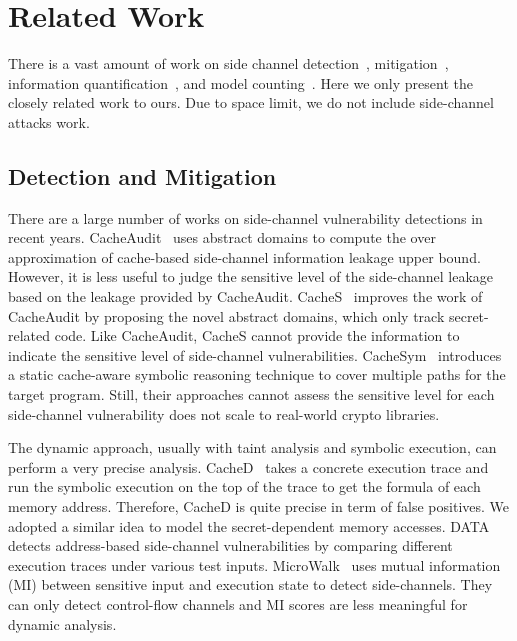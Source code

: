 \section{Related Work}

There is a vast amount of work on 
side channel 
detection~\cite{182946, 236338, Brotzman19Casym, 203878,217537,Wichelmann:2018:MFF:3274694.3274741,langley2010ctgrind}, 
mitigation~\cite{Page2005PartitionedCA,
Wang:2007:NCD:1250662.1250723,Zhang:2015:HDL:2775054.2694372,Li:2014:SLH:2541940.2541947,
236344,shih2017t,Coppens:2009:PMT:1607723.1608124,
brickell2006software,crane2015thwarting}, 
information
quantification~\cite{biondi2018scalable,10.1007/978-3-642-31424-7_40,McCamantE2008,5207642,Phan:2012:SQI:2382756.2382791,Chattopadhyay:2017:QIL:3127041.3127044}, 
and model counting~\cite{wei2005new, gomes2007sampling, gomes2006model, kroc2008leveraging, Chattopadhyay:2017:QIL:3127041.3127044}.
Here we only present the closely related work to ours.
Due to space limit, we do not include side-channel attacks work.

\subsection{Detection and Mitigation}

There are a large number of works on side-channel vulnerability detections in
recent years.  CacheAudit~\cite{182946} uses abstract domains to compute the
over approximation of cache-based side-channel information leakage upper bound.
However, it is
less useful to judge the sensitive level of the side-channel leakage based on
the leakage provided by CacheAudit. CacheS~\cite{236338} improves the work of
CacheAudit by proposing the novel abstract domains, which only track
secret-related code. Like CacheAudit, CacheS cannot provide the information to
indicate the sensitive level of side-channel vulnerabilities.
CacheSym~\cite{Brotzman19Casym} introduces a static cache-aware symbolic
reasoning technique to cover multiple paths for the target program. Still, their
approaches cannot assess the sensitive level for each side-channel
vulnerability does not scale to real-world crypto libraries.

The dynamic approach, usually with taint analysis and symbolic execution,
can perform a very precise analysis. CacheD~\cite{203878} takes a concrete
 execution trace and run the symbolic execution on the top of the trace
to get the formula of each memory address. Therefore, CacheD is
quite precise in term of false positives. We adopted a similar idea to model the
secret-dependent memory accesses. DATA~\cite{217537} detects address-based
side-channel vulnerabilities by comparing different execution traces under
various test inputs. MicroWalk~\cite{Wichelmann:2018:MFF:3274694.3274741} uses
mutual information (MI) between sensitive input and execution state to detect
side-channels. They can only detect control-flow channels and MI scores are less
meaningful for dynamic analysis.

